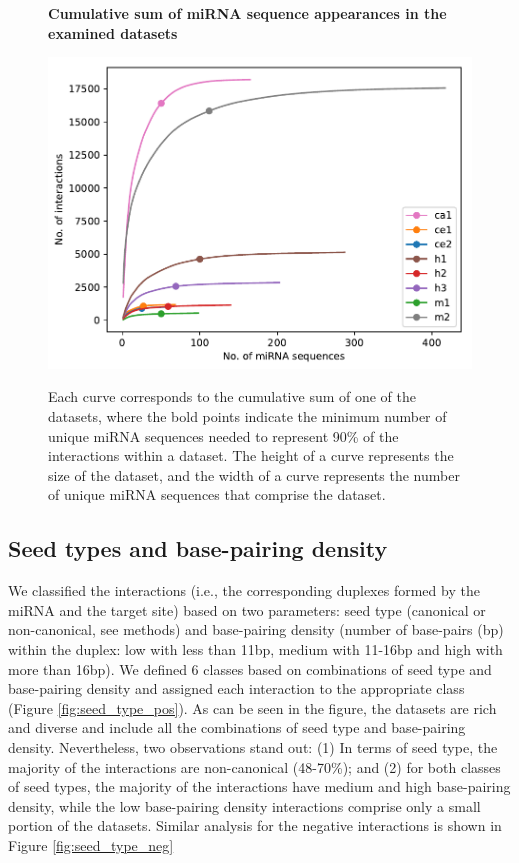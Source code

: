 \begin{figure}[h!]
  \caption{\textbf{Cumulative sum of miRNA sequence appearances in the examined datasets}}
      \includegraphics[width=\textwidth]{figures/1_mirna_dist.pdf}
      \label{fig:datasetplot}
      \caption*{Each curve corresponds to the cumulative sum of one of the datasets, where the bold points indicate the minimum number of unique miRNA sequences needed to represent 90\% of the interactions within a dataset. The height of a curve represents the size of the dataset, and the width of a curve represents the number of unique miRNA sequences that comprise the dataset.}
      \end{figure}

\subsection{Seed types and base-pairing density}
We classified the interactions (i.e., the corresponding duplexes formed by the miRNA and the target site) based on two parameters: seed type (canonical or non-canonical, see methods) and base-pairing density (number of base-pairs (bp) within the duplex: low with less than 11bp, medium with 11-16bp and high with more than 16bp). We defined 6 classes based on combinations of seed type and base-pairing density and assigned each interaction to the appropriate class (Figure \ref{fig:seed_type_pos}). As can be seen in the figure, the datasets are rich and diverse and include all the combinations of seed type and base-pairing density.
Nevertheless, two observations stand out: 
(1) In terms of seed type, the majority of the interactions are non-canonical (48-70\%); and (2) for both classes of seed types,  the majority of the interactions have medium and high base-pairing density, while the low base-pairing density interactions comprise only a small portion of the datasets. Similar analysis for the negative interactions is shown in Figure \ref{fig:seed_type_neg}


